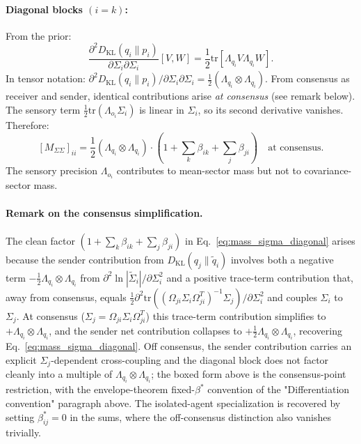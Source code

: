 \documentclass[11pt]{article}
\begin{document}
\paragraph{Diagonal blocks $(i = k)$:} From the prior:
\begin{equation}
\frac{\partial^2 D_{\mathrm{KL}}(q_i \| p_i)}{\partial \Sigma_i \partial \Sigma_i}[V, W] = \frac{1}{2}\mathrm{tr}[\Lambda_{q_i} V \Lambda_{q_i} W].
\end{equation}
In tensor notation: $\partial^2 D_{\mathrm{KL}}(q_i \| p_i)/\partial \Sigma_i \partial \Sigma_i = \frac{1}{2}(\Lambda_{q_i} \otimes \Lambda_{q_i})$. From consensus as receiver and sender, identical contributions arise \emph{at consensus} (see remark below). The sensory term $\frac{1}{2}\mathrm{tr}(\Lambda_{o_i}\Sigma_i)$ is linear in $\Sigma_i$, so its second derivative vanishes. Therefore:
\begin{equation}
\boxed{[M_{\Sigma\Sigma}]_{ii} = \frac{1}{2}(\Lambda_{q_i} \otimes \Lambda_{q_i}) \cdot \left(1 + \sum_k \beta_{ik} + \sum_j \beta_{ji}\right) \quad \text{at consensus.}}
\label{eq:mass_sigma_diagonal}
\end{equation}
The sensory precision $\Lambda_{o_i}$ contributes to mean-sector mass but not to covariance-sector mass.

\paragraph{Remark on the consensus simplification.} The clean factor $(1 + \sum_k \beta_{ik} + \sum_j \beta_{ji})$ in Eq.~\eqref{eq:mass_sigma_diagonal} arises because the sender contribution from $D_{\mathrm{KL}}(q_j \| \tilde{q}_i)$ involves both a negative term $-\frac{1}{2}\Lambda_{q_i} \otimes \Lambda_{q_i}$ from $\partial^2 \ln |\tilde{\Sigma}_i|/\partial \Sigma_i^2$ and a positive trace-term contribution that, away from consensus, equals $\frac{1}{2}\partial^2 \mathrm{tr}((\Omega_{ji}\Sigma_i\Omega_{ji}^T)^{-1}\Sigma_j)/\partial\Sigma_i^2$ and couples $\Sigma_i$ to $\Sigma_j$. At consensus ($\Sigma_j = \Omega_{ji}\Sigma_i\Omega_{ji}^T$) this trace-term contribution simplifies to $+\Lambda_{q_i} \otimes \Lambda_{q_i}$, and the sender net contribution collapses to $+\frac{1}{2}\Lambda_{q_i}\otimes\Lambda_{q_i}$, recovering Eq.~\eqref{eq:mass_sigma_diagonal}. Off consensus, the sender contribution carries an explicit $\Sigma_j$-dependent cross-coupling and the diagonal block does not factor cleanly into a multiple of $\Lambda_{q_i}\otimes\Lambda_{q_i}$; the boxed form above is the consensus-point restriction, with the envelope-theorem fixed-$\beta^*$ convention of the "Differentiation convention" paragraph above. The isolated-agent specialization is recovered by setting $\beta_{ij}^* = 0$ in the sums, where the off-consensus distinction also vanishes trivially.
\end{document}
